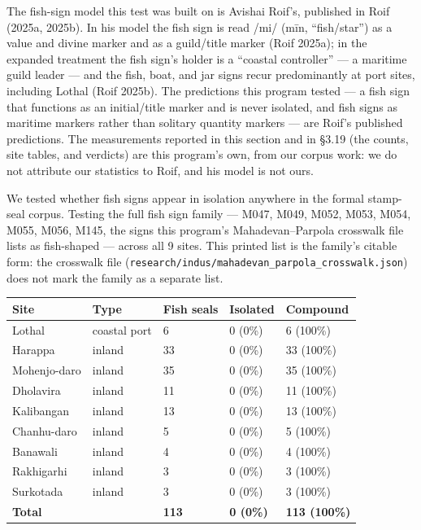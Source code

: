 \documentclass[
]{article}
\newcounter{none} %
\begin{document}
The fish-sign model this test was built on is Avishai Roif's,
published in Roif (2025a, 2025b). In his model the fish sign is read
/mi/ (m\={i}n, ``fish/star'') as a value and divine marker and as a
guild/title marker (Roif 2025a); in the expanded treatment the
fish sign's holder is a ``coastal controller'' --- a maritime
guild leader --- and the fish, boat, and jar signs recur
predominantly at port sites, including Lothal (Roif 2025b). The
predictions this program tested --- a fish sign that functions as
an initial/title marker and is never isolated, and fish signs as
maritime markers rather than solitary quantity markers --- are
Roif's published predictions. The measurements reported in this
section and in \S3.19 (the counts, site tables, and verdicts) are
this program's own, from our corpus work: we do not attribute
our statistics to Roif, and his model is not ours.

We tested whether fish signs appear in isolation anywhere in the formal stamp-seal corpus.
Testing the full fish sign family --- M047, M049, M052, M053, M054, M055, M056, M145, the signs this program's Mahadevan--Parpola crosswalk file lists as fish-shaped --- across all 9 sites. This printed list is the family's citable form: the crosswalk file (\texttt{research/indus/mahadevan\_parpola\_crosswalk.json}) does not mark the family as a separate list.

{\def\LTcaptype{none} %
\begin{longtable}[]{@{}lllll@{}}
\toprule\noalign{}
Site & Type & Fish seals & Isolated & Compound \\
\midrule\noalign{}
\endhead
\bottomrule\noalign{}
\endlastfoot
Lothal & coastal port & 6 & 0 (0\%) & 6 (100\%) \\
Harappa & inland & 33 & 0 (0\%) & 33 (100\%) \\
Mohenjo-daro & inland & 35 & 0 (0\%) & 35 (100\%) \\
Dholavira & inland & 11 & 0 (0\%) & 11 (100\%) \\
Kalibangan & inland & 13 & 0 (0\%) & 13 (100\%) \\
Chanhu-daro & inland & 5 & 0 (0\%) & 5 (100\%) \\
Banawali & inland & 4 & 0 (0\%) & 4 (100\%) \\
Rakhigarhi & inland & 3 & 0 (0\%) & 3 (100\%) \\
Surkotada & inland & 3 & 0 (0\%) & 3 (100\%) \\
\textbf{Total} & & \textbf{113} & \textbf{0 (0\%)} & \textbf{113
(100\%)} \\
\end{longtable}
}
\end{document}
